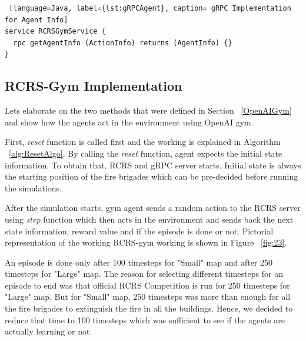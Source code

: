 \documentclass[12pt]{report}
\begin{document}
\begin{lstlisting} [language=Java, label={lst:gRPCAgent}, caption= gRPC Implementation for Agent Info] 
service RCRSGymService {
  rpc getAgentInfo (ActionInfo) returns (AgentInfo) {}
}
\end{lstlisting}

\subsection{RCRS-Gym Implementation} \label{RCRSGymImplementation}

Lets elaborate on the two methods that were defined in Section ~\ref{OpenAIGym} and show how the agents act in the environment using OpenAI gym. 

First, \emph{reset} function is called first and the working is explained in Algorithm ~\ref{alg:ResetAlgo}. By calling the \emph{reset} function, agent expects the initial state information. To obtain that, RCRS and gRPC server starts. Initial state is always the starting position of the fire brigades which can be pre-decided before running the simulations.

After the simulation starts, gym agent sends a random action to the RCRS server using \emph{step} function which then acts in the environment and sends back the next state information, reward value and if the episode is done or not. Pictorial representation of the working RCRS-gym working is shown in Figure ~\ref{fig:23}. 

An episode is done only after 100 timesteps for "Small" map and after 250 timesteps for "Large" map. The reason for selecting different timesteps for an episode to end was that official RCRS Competition is run for 250 timesteps for "Large" map. But for "Small" map, 250 timesteps was more than enough for all the fire brigades to extinguish the fire in all the buildings. Hence, we decided to reduce that time to 100 timesteps which was sufficient to see if the agents are actually learning or not. 
\end{document}
